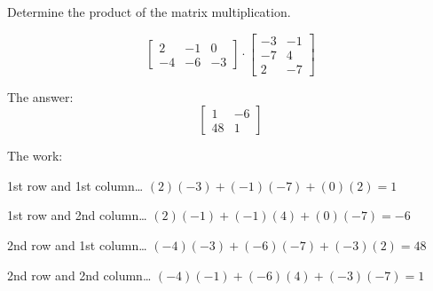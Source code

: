 
\begin{question}
Determine the product of the matrix multiplication.

\[\left[\begin{matrix}2 & -1 & 0\\-4 & -6 & -3\end{matrix}\right] \cdot \left[\begin{matrix}-3 & -1\\-7 & 4\\2 & -7\end{matrix}\right]\]
\end{question}

\begin{solution}
The answer: \[\left[\begin{matrix}1 & -6\\48 & 1\end{matrix}\right]\]

The work:

1st row and 1st column\ldots{} \((2)(-3)+(-1)(-7)+(0)(2) = 1\)

1st row and 2nd column\ldots{} \((2)(-1)+(-1)(4)+(0)(-7) = -6\)

2nd row and 1st column\ldots{} \((-4)(-3)+(-6)(-7)+(-3)(2) = 48\)

2nd row and 2nd column\ldots{} \((-4)(-1)+(-6)(4)+(-3)(-7) = 1\)
\end{solution}

